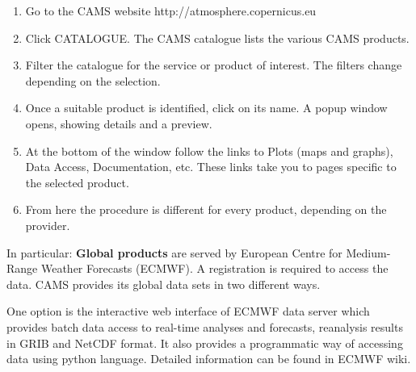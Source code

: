 \documentclass[9pt]{report}
\begin{document}
\begin{enumerate}[noitemsep,topsep=\mdcompacttopsep]%

\item{}Go to the CAMS website http://atmosphere.copernicus.eu%

\item{}Click CATALOGUE. The CAMS catalogue lists the various CAMS products.%

\item{}Filter the catalogue for the service or product of interest. The filters change depending on the selection.%

\item{}Once a suitable product is identified, click on its name. A popup window opens, showing details and a preview.%

\item{}At the bottom of the window follow the links to Plots (maps and graphs), Data Access, Documentation, etc. These links take you to pages specific to the selected product.%

\item{}From here the procedure is different for every product, depending on the provider.%
\end{enumerate}%

\noindent{}In particular:
\mdbr
{}\mdbr
{}\textbf{Global products} are served by European Centre for Medium-Range Weather Forecasts (ECMWF).
A registration is required to access the data. 
CAMS provides its global data sets in two different ways.%

One option is the interactive web interface of ECMWF data server which provides batch data access to real-time analyses and forecasts, reanalysis results in GRIB and NetCDF format.
It also provides a programmatic way of accessing data using python language. Detailed information can be found in ECMWF wiki.%
\end{document}
